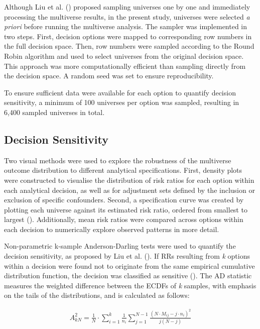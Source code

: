 \documentclass[
  man,
  floatsintext,
  longtable,
  nolmodern,
  notxfonts,
  notimes,
  colorlinks=true,linkcolor=blue,citecolor=blue,urlcolor=blue]{apa7}
\begin{document}
Although Liu et al. ()
proposed sampling universes one by one and immediately processing the
multiverse results, in the present study, universes were selected
\emph{a priori} before running the multiverse analysis. The sampler was
implemented in two steps. First, decision options were mapped to
corresponding row numbers in the full decision space. Then, row numbers
were sampled according to the Round Robin algorithm and used to select
universes from the original decision space. This approach was more
computationally efficient than sampling directly from the decision
space. A random seed was set to ensure reproducibility.

To ensure sufficient data were available for each option to quantify
decision sensitivity, a minimum of 100 universes per option was sampled,
resulting in 6,400 sampled universes in total.

\subsection{Decision Sensitivity}\label{decision-sensitivity}

Two visual methods were used to explore the robustness of the multiverse
outcome distribution to different analytical specifications. First,
density plots were constructed to visualise the distribution of risk
ratios for each option within each analytical decision, as well as for
adjustment sets defined by the inclusion or exclusion of specific
confounders. Second, a specification curve was created by plotting each
universe against its estimated risk ratio, ordered from smallest to
largest (). Additionally, mean risk ratios were compared across options
within each decision to numerically explore observed patterns in more
detail.

Non-parametric k-sample Anderson-Darling tests were used to quantify the
decision sensitivity, as proposed by Liu et al.
(). If RRs resulting from
\emph{k} options within a decision were found not to originate from the
same empirical cumulative distribution function, the decision was
classified as sensitive (). The AD statistic measures the weighted difference
between the ECDFs of \emph{k} samples, with emphasis on the tails of the
distributions, and is calculated as follows:

\begin{align}
  A_{kN}^2 = \frac{1}{N} \cdot \sum_{i=1}^k \frac{1}{n_i} \sum_{j=1}^{N-1} \frac{(N \cdot M_{ij} - j \cdot n_i)^2}{j(N - j)}
\end{align}
\end{document}
